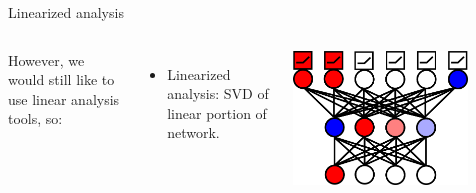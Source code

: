 \documentclass{beamer}
\begin{document}
\begin{frame}{Linearized analysis}
\begin{columns}
	However, we would still like to use linear analysis tools, so:
	\begin{itemize}
	    \item<2-> Linearized analysis: SVD of linear portion of network. 
	\end{itemize}
	\begin{center}
	    \includegraphics[width=0.8\textwidth]{../writing/cogsci_2017/figures/network_diagram.png}
	\end{center}
\end{columns}
\end{frame}
\end{document}

